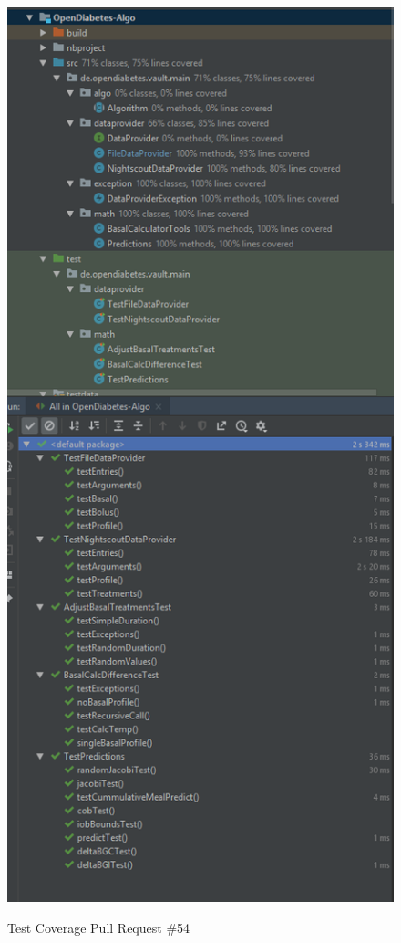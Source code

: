 \documentclass[accentcolor=tud0b,12pt,paper=a4]{tudreport}
\begin{document}
\begin{figure}[h]
\centering
\caption{Test Coverage Pull Request \#54}
\includegraphics[width=\textwidth,height=\textheight,keepaspectratio]{pr-cov-54}
\label{pr-cov:54}
\end{figure}
\end{document}
